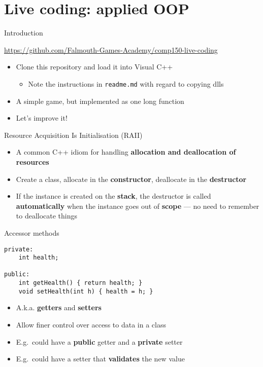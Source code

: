 \part{Live coding: applied OOP}
\frame{\partpage}

\begin{frame}{Introduction}
    \begin{center}
        \url{https://github.com/Falmouth-Games-Academy/comp150-live-coding}
    \end{center}
    \begin{itemize}
        \item Clone this repository and load it into Visual C++
            \begin{itemize}
                \item Note the instructions in \texttt{readme.md} with regard to copying dlls
            \end{itemize}
        \item A simple game, but implemented as one long function
        \item Let's improve it!
    \end{itemize}
\end{frame}

\begin{frame}{Resource Acquisition Is Initialisation (RAII)}
    \begin{itemize}
        \item A common C++ idiom for handling \textbf{allocation and deallocation of resources} \pause
        \item Create a class, allocate in the \textbf{constructor}, deallocate in the \textbf{destructor} \pause
        \item If the instance is created on the \textbf{stack}, the destructor is called \textbf{automatically}
            when the instance goes out of \textbf{scope}
            --- no need to remember to deallocate things
    \end{itemize}
\end{frame}

\begin{frame}[fragile]{Accessor methods}
    \begin{lstlisting}
private:
    int health;
    
public:
    int getHealth() { return health; }
    void setHealth(int h) { health = h; }
    \end{lstlisting}
    \pause
    \begin{itemize}
        \item A.k.a. \textbf{getters} and \textbf{setters} \pause
        \item Allow finer control over access to data in a class \pause
        \item E.g.\ could have a \textbf{public} getter and a \textbf{private} setter \pause
        \item E.g.\ could have a setter that \textbf{validates} the new value
    \end{itemize}
\end{frame}

